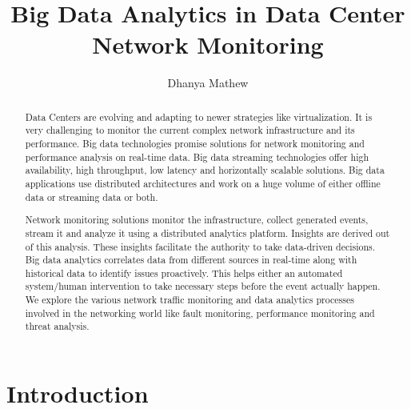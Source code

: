 \documentclass[sigconf]{acmart}
\begin{document}
\title{Big Data Analytics in Data Center Network Monitoring}


\author{Dhanya Mathew}

\renewcommand{\shortauthors}{G. v. Laszewski}


\begin{abstract}

Data Centers are evolving and adapting to newer strategies like virtualization.  It is very challenging to monitor the current complex network infrastructure and its performance. Big data technologies promise solutions for network monitoring and performance analysis on real-time data. Big data streaming technologies offer high availability, high throughput, low latency and horizontally scalable solutions. Big data applications use distributed architectures and work on a huge volume of either offline data or streaming data or both. 

Network monitoring solutions monitor the infrastructure, collect generated events, stream it and analyze it using a distributed analytics platform. Insights are derived out of this analysis. These insights facilitate the authority to take data-driven decisions. Big data analytics correlates data from different sources in real-time along with historical data to identify issues proactively. This helps either an automated system/human intervention to take necessary steps before the event actually happen. We explore the various network traffic monitoring and data analytics processes involved in the networking world like fault monitoring, performance monitoring and threat analysis.

\end{abstract}



\maketitle



\section{Introduction}
\end{document}
